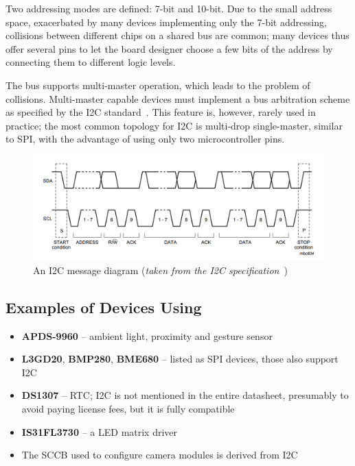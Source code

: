 Two addressing modes are defined: 7-bit and 10-bit. Due to the small address space, exacerbated by many devices implementing only the 7-bit addressing, collisions between different chips on a shared bus are common; many devices thus offer several pins to let the board designer choose a few bits of the address by connecting them to different logic levels.

The bus supports multi-master operation, which leads to the problem of collisions. Multi-master capable devices must implement a bus arbitration scheme as specified by the \gls{I2C} standard~\cite{i2c-spec}. This feature is, however, rarely used in practice; the most common topology for \gls{I2C} is multi-drop single-master, similar to \gls{SPI}, with the advantage of using only two microcontroller pins.

\begin{figure}[h]
	\centering
	\includegraphics[width=.9\textwidth] {img/i2c-frame.png}
	\caption[\IIC message diagram]{\label{fig:i2c_frame}An \gls{I2C} message diagram (\textit{taken from the \gls{I2C} specification~\cite{i2c-spec}})}
\end{figure}

\subsection{Examples of Devices Using \texorpdfstring{\IIC}{I2C}}

\begin{itemize}
	\item \textbf{APDS-9960} -- ambient light, proximity and gesture sensor
	\item \textbf{L3GD20}, \textbf{BMP280}, \textbf{BME680} -- listed as \gls{SPI} devices, those also support \gls{I2C}
	\item \textbf{DS1307} -- \gls{RTC}; \gls{I2C} is not mentioned in the entire datasheet, presumably to avoid paying license fees, but it is fully compatible
	\item \textbf{IS31FL3730} -- a \gls{LED} matrix driver
	\item The \gls{SCCB} used to configure camera modules is derived from \gls{I2C}
\end{itemize}

